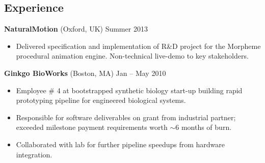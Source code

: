 \documentclass[margin]{res}
\newcommand{\locdatesubsection}[3]{\textbf{#1} (#2) \hfill #3}
\begin{document}
\begin{sloppypar}
\begin{resume}
\section{Experience}
\locdatesubsection{NaturalMotion}{Oxford, UK}{Summer 2013}
\begin{itemize}
\item Delivered specification and implementation of R\&D project for the Morpheme procedural animation engine. Non-technical live-demo to key stakeholders.
\end{itemize}

\locdatesubsection{Ginkgo BioWorks}{Boston, MA}{Jan -- May 2010}
\begin{itemize}
\item Employee \# 4 at bootstrapped synthetic biology start-up building rapid prototyping pipeline for engineered biological systems. 
\item Responsible for software deliverables on grant from industrial partner; exceeded milestone payment requirements worth $\sim 6$ months of burn.
\item Collaborated with lab for further pipeline speedups from hardware integration.
\end{itemize}



\end{resume}
\end{sloppypar}
\end{document}
